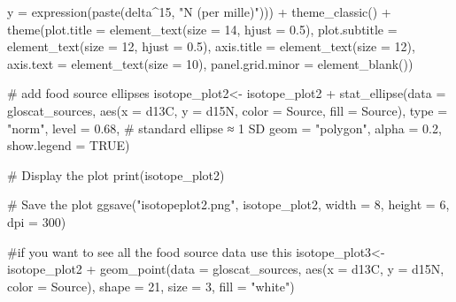 \documentclass[
]{agujournal2019}
\newenvironment{Shaded}{\begin{snugshade}}{\end{snugshade}}
\newcommand{\AttributeTok}[1]{\textcolor[rgb]{0.40,0.45,0.13}{#1}}
\newcommand{\CommentTok}[1]{\textcolor[rgb]{0.37,0.37,0.37}{#1}}
\newcommand{\ConstantTok}[1]{\textcolor[rgb]{0.56,0.35,0.01}{#1}}
\newcommand{\DecValTok}[1]{\textcolor[rgb]{0.68,0.00,0.00}{#1}}
\newcommand{\FloatTok}[1]{\textcolor[rgb]{0.68,0.00,0.00}{#1}}
\newcommand{\FunctionTok}[1]{\textcolor[rgb]{0.28,0.35,0.67}{#1}}
\newcommand{\NormalTok}[1]{\textcolor[rgb]{0.00,0.23,0.31}{#1}}
\newcommand{\OtherTok}[1]{\textcolor[rgb]{0.00,0.23,0.31}{#1}}
\newcommand{\SpecialCharTok}[1]{\textcolor[rgb]{0.37,0.37,0.37}{#1}}
\newcommand{\StringTok}[1]{\textcolor[rgb]{0.13,0.47,0.30}{#1}}
\begin{document}
\begin{Shaded}
\begin{Highlighting}[]
       \AttributeTok{y =} \FunctionTok{expression}\NormalTok{(}\FunctionTok{paste}\NormalTok{(delta}\SpecialCharTok{\^{}}\DecValTok{15}\NormalTok{, }\StringTok{"N (per mille)"}\NormalTok{))) }\SpecialCharTok{+}
  \FunctionTok{theme\_classic}\NormalTok{() }\SpecialCharTok{+}
  \FunctionTok{theme}\NormalTok{(}\AttributeTok{plot.title =} \FunctionTok{element\_text}\NormalTok{(}\AttributeTok{size =} \DecValTok{14}\NormalTok{, }\AttributeTok{hjust =} \FloatTok{0.5}\NormalTok{),}
        \AttributeTok{plot.subtitle =} \FunctionTok{element\_text}\NormalTok{(}\AttributeTok{size =} \DecValTok{12}\NormalTok{, }\AttributeTok{hjust =} \FloatTok{0.5}\NormalTok{),}
        \AttributeTok{axis.title =} \FunctionTok{element\_text}\NormalTok{(}\AttributeTok{size =} \DecValTok{12}\NormalTok{),}
        \AttributeTok{axis.text =} \FunctionTok{element\_text}\NormalTok{(}\AttributeTok{size =} \DecValTok{10}\NormalTok{),}
        \AttributeTok{panel.grid.minor =} \FunctionTok{element\_blank}\NormalTok{())}

\CommentTok{\# add food source ellipses}
\NormalTok{isotope\_plot2}\OtherTok{\textless{}{-}}\NormalTok{ isotope\_plot2 }\SpecialCharTok{+} \FunctionTok{stat\_ellipse}\NormalTok{(}\AttributeTok{data =}\NormalTok{ gloscat\_sources,}
                 \FunctionTok{aes}\NormalTok{(}\AttributeTok{x =}\NormalTok{ d13C, }\AttributeTok{y =}\NormalTok{ d15N, }\AttributeTok{color =}\NormalTok{ Source, }\AttributeTok{fill =}\NormalTok{ Source),}
                 \AttributeTok{type =} \StringTok{"norm"}\NormalTok{, }\AttributeTok{level =} \FloatTok{0.68}\NormalTok{,  }\CommentTok{\# standard ellipse ≈ 1 SD}
                 \AttributeTok{geom =} \StringTok{"polygon"}\NormalTok{, }\AttributeTok{alpha =} \FloatTok{0.2}\NormalTok{, }\AttributeTok{show.legend =} \ConstantTok{TRUE}\NormalTok{)}

\CommentTok{\# Display the plot}
\FunctionTok{print}\NormalTok{(isotope\_plot2)}

\CommentTok{\# Save the plot}
\FunctionTok{ggsave}\NormalTok{(}\StringTok{"isotopeplot2.png"}\NormalTok{, isotope\_plot2, }
       \AttributeTok{width =} \DecValTok{8}\NormalTok{, }\AttributeTok{height =} \DecValTok{6}\NormalTok{, }\AttributeTok{dpi =} \DecValTok{300}\NormalTok{)}

\CommentTok{\#if you want to see all the food source data use this}
\NormalTok{isotope\_plot3}\OtherTok{\textless{}{-}}\NormalTok{isotope\_plot2 }\SpecialCharTok{+} \FunctionTok{geom\_point}\NormalTok{(}\AttributeTok{data =}\NormalTok{ gloscat\_sources,}
                           \FunctionTok{aes}\NormalTok{(}\AttributeTok{x =}\NormalTok{ d13C, }\AttributeTok{y =}\NormalTok{ d15N, }\AttributeTok{color =}\NormalTok{ Source),}
                           \AttributeTok{shape =} \DecValTok{21}\NormalTok{, }\AttributeTok{size =} \DecValTok{3}\NormalTok{, }\AttributeTok{fill =} \StringTok{"white"}\NormalTok{)}


\end{Highlighting}
\end{Shaded}
\end{document}
